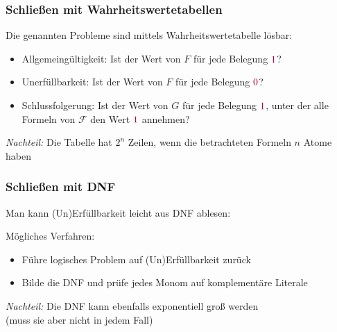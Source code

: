\documentclass[aspectratio=1610,onlymath]{beamer}
\begin{document}
\begin{frame}\frametitle{Schließen mit Wahrheitswertetabellen}

Die genannten Probleme sind mittels Wahrheitswertetabelle lösbar:%
\begin{itemize}
\item \alert{Allgemeingültigkeit:} Ist der Wert von $F$ für jede Belegung $\textcolor{purple}{1}$?
\item \alert{Unerfüllbarkeit:} Ist der Wert von $F$ für jede Belegung $\textcolor{purple}{0}$?
\item \alert{Schlussfolgerung:} Ist der Wert von $G$ für jede Belegung $\textcolor{purple}{1}$, unter der alle Formeln von $\mathcal{F}$ den Wert $\textcolor{purple}{1}$ annehmen?
\end{itemize}\pause

\emph{Nachteil:} Die Tabelle hat $2^n$ Zeilen, wenn die betrachteten Formeln $n$ Atome haben
\bigskip


\end{frame}

\begin{frame}[t]\frametitle{Schließen mit DNF}

Man kann (Un)Erfüllbarkeit leicht aus DNF ablesen:\medskip


Mögliches Verfahren:
\begin{itemize}
\item Führe logisches Problem auf (Un)Erfüllbarkeit zurück
\item Bilde die DNF und prüfe jedes Monom auf komplementäre Literale
\end{itemize}
\emph{Nachteil:} Die DNF kann ebenfalls exponentiell groß werden\\ (muss sie aber nicht in jedem Fall)

\end{frame}
\end{document}
